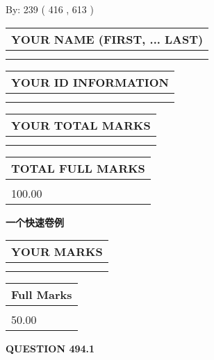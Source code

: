 \documentclass{ctexart}
\begin{document}
   
\hspace{1.0in} By: 
 239 ( 416 ,  613 )
   
   
   
   
\newpage 
\setcounter{page}{ 
   494001 } 
   
   
   
   
\noindent\begin{tabular}{|l|}
\hline
YOUR NAME (FIRST, ... LAST)  \\
\hline
 \\ 
 \\ 
\hline
\end{tabular}
\hspace{0.05in} \begin{tabular}{|l|}
\hline
 YOUR   ID   INFORMATION  \\
\hline
 \\ 
 \\ 
\hline
\end{tabular}
   
   
\vspace{0.2in}\noindent\begin{tabular}{|l|}
\hline
YOUR TOTAL MARKS  \\
\hline
 \\ 
 \\ 
\hline
\end{tabular}
\hspace{0.05in} \begin{tabular}{|l|}
\hline
TOTAL FULL MARKS  \\
\hline
 \\ 
100.00 \\
\hline
\end{tabular}
   
   
 \vspace{0.2in}
{\LARGE {\textbf{ 一个快速卷例}}}
   
   
  
\vspace{0.2in}
  
\noindent\begin{tabular}{|l|}
\hline
 YOUR MARKS  \\
\hline
 \\ 
 \\ 
\hline
\end{tabular}
\hspace{0.05in} \begin{tabular}{|l|}
\hline
 Full Marks  \\
\hline
 \\ 
50.00 \\
\hline
\end{tabular}
{\textbf{\Large{QUESTION
494.1 
}}}
  
\end{document}
